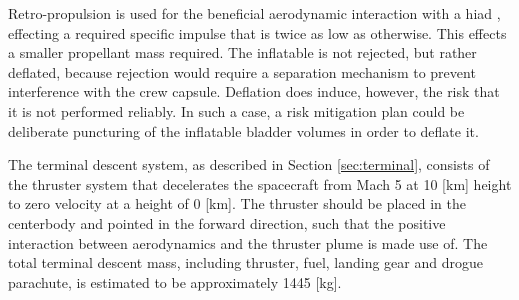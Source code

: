Retro-propulsion is used for the beneficial aerodynamic interaction with a \gls{hiad} \cite{Korzun2009}, effecting a required specific impulse that is twice as low as otherwise. This effects a smaller propellant mass required. The inflatable is not rejected, but rather deflated, because rejection would require a separation mechanism to prevent interference with the crew capsule. Deflation does induce, however, the risk that it is not performed reliably. In such a case, a risk mitigation plan could be deliberate puncturing of the inflatable bladder volumes in order to deflate it.


The terminal descent system, as described in Section \ref{sec:terminal}, consists of the thruster system that decelerates the spacecraft from Mach 5 at 10 [km] height to zero velocity at a height of 0 [km]. The thruster should be placed in the centerbody and pointed in the forward direction, such that the positive interaction between aerodynamics and the thruster plume is made use of. The total terminal descent mass, including thruster, fuel, landing gear and drogue parachute, is estimated to be approximately 1445 [kg].